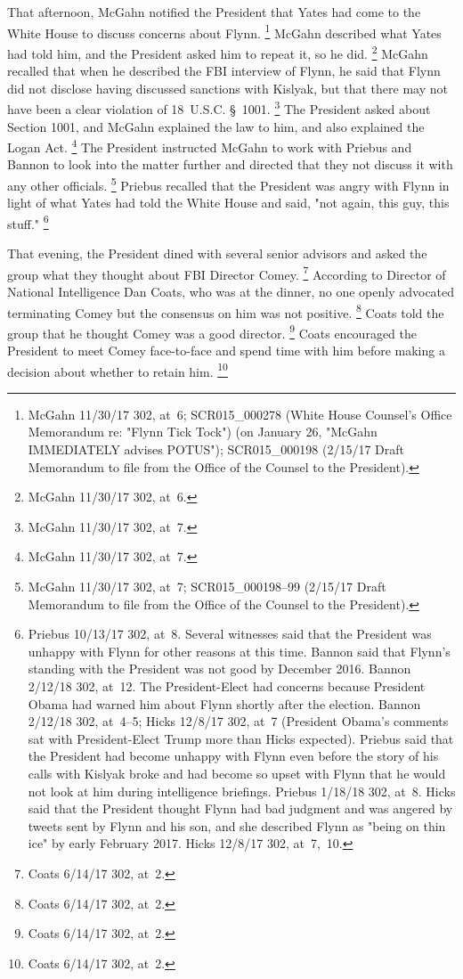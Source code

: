 That afternoon, McGahn notified the President that Yates had come to the White House to discuss concerns about Flynn.%
\footnote{McGahn 11/30/17 302, at~6;
SCR015\_000278 (White House Counsel's Office Memorandum re: "Flynn Tick Tock") (on January 26, "McGahn IMMEDIATELY advises POTUS");
SCR015\_000198 (2/15/17 Draft Memorandum to file from the Office of the Counsel to the President).}
McGahn described what Yates had told him, and the President asked him to repeat it, so he did.%
\footnote{McGahn 11/30/17 302, at~6.}
McGahn recalled that when he described the FBI interview of Flynn, he said that Flynn did not disclose having discussed sanctions with Kislyak, but that there may not have been a clear violation of 18~U.S.C. \S~1001.%
\footnote{McGahn 11/30/17 302, at~7.}
The President asked about Section 1001, and McGahn explained the law to him, and also explained the Logan Act.%
\footnote{McGahn 11/30/17 302, at~7.}
The President instructed McGahn to work with Priebus and Bannon to look into the matter further and directed that they not discuss it with any other officials.%
\footnote{McGahn 11/30/17 302, at~7;
SCR015\_000198--99 (2/15/17 Draft Memorandum to file from the Office of the Counsel to the President).}
Priebus recalled that the President was angry with Flynn in light of what Yates had told the White House and said, "not again, this guy, this stuff."%
\footnote{Priebus 10/13/17 302, at~8.
Several witnesses said that the President was unhappy with Flynn for other reasons at this time.
Bannon said that Flynn's standing with the President was not good by December 2016.
Bannon 2/12/18 302, at~12.
The President-Elect had concerns because President Obama had warned him about Flynn shortly after the election.
Bannon 2/12/18 302, at~4--5;
Hicks 12/8/17 302, at~7 (President Obama's comments sat with President-Elect Trump more than Hicks expected).
Priebus said that the President had become unhappy with Flynn even before the story of his calls with Kislyak broke and had become so upset with Flynn that he would not look at him during intelligence briefings.
Priebus 1/18/18 302, at~8.
Hicks said that the President thought Flynn had bad judgment and was angered by tweets sent by Flynn and his son, and she described Flynn as "being on thin ice" by early February 2017.
Hicks 12/8/17 302, at~7,~10.}

That evening, the President dined with several senior advisors and asked the group what they thought about FBI Director Comey.%
\footnote{Coats 6/14/17 302, at~2.}
According to Director of National Intelligence Dan Coats, who was at the dinner, no one openly advocated terminating Comey but the consensus on him was not positive.%
\footnote{Coats 6/14/17 302, at~2.}
Coats told the group that he thought Comey was a good director.%
\footnote{Coats 6/14/17 302, at~2.}
Coats encouraged the President to meet Comey face-to-face and spend time with him before making a decision about whether to retain him.%
\footnote{Coats 6/14/17 302, at~2.}

